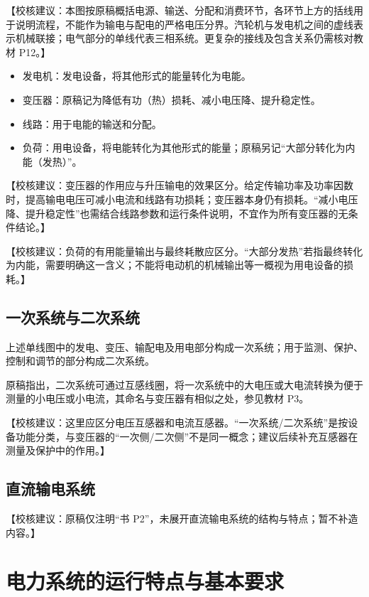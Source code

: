 \documentclass[
  12pt,
  UTF8,
  a4paper,
  fontset=fandol,
  oneside,
  openany
]{ctexrep}
\newcommand{\reviewnote}[1]{%
  \par\smallskip
  {\color{reviewgray}\small\noindent【校核建议：#1】\par}
  \smallskip
}
\begin{document}
\reviewnote{本图按原稿概括电源、输送、分配和消费环节，各环节上方的括线用于说明流程，不能作为输电与配电的严格电压分界。汽轮机与发电机之间的虚线表示机械联接；电气部分的单线代表三相系统。更复杂的接线及包含关系仍需核对教材 P12。}

\begin{itemize}
  \item 发电机：发电设备，将其他形式的能量转化为电能。
  \item 变压器：原稿记为降低有功（热）损耗、减小电压降、提升稳定性。
  \item 线路：用于电能的输送和分配。
  \item 负荷：用电设备，将电能转化为其他形式的能量；原稿另记“大部分转化为内能（发热）”。
\end{itemize}

\reviewnote{变压器的作用应与升压输电的效果区分。给定传输功率及功率因数时，提高输电电压可减小电流和线路有功损耗；变压器本身仍有损耗。“减小电压降、提升稳定性”也需结合线路参数和运行条件说明，不宜作为所有变压器的无条件结论。}

\reviewnote{负荷的有用能量输出与最终耗散应区分。“大部分发热”若指最终转化为内能，需要明确这一含义；不能将电动机的机械输出等一概视为用电设备的损耗。}

\subsection{一次系统与二次系统}

上述单线图中的发电、变压、输配电及用电部分构成一次系统；用于监测、保护、控制和调节的部分构成二次系统。

原稿指出，二次系统可通过互感线圈，将一次系统中的大电压或大电流转换为便于测量的小电压或小电流，其命名与变压器有相似之处，参见教材 P3。

\reviewnote{这里应区分电压互感器和电流互感器。“一次系统/二次系统”是按设备功能分类，与变压器的“一次侧/二次侧”不是同一概念；建议后续补充互感器在测量及保护中的作用。}

\subsection{直流输电系统}

\reviewnote{原稿仅注明“书 P2”，未展开直流输电系统的结构与特点；暂不补造内容。}

\section{电力系统的运行特点与基本要求}
\end{document}
